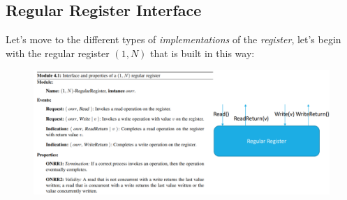 \documentclass{article}
\begin{document}
\subsection{Regular Register Interface}
Let's move to the different types of \emph{implementations} of the \emph{register}, let's begin with the regular register $(1,N)$ that is built in this way:
\begin{figure}[H]
  \centering
  \includegraphics[scale=0.9,left]{cattura67.png}
\end{figure}
\end{document}
